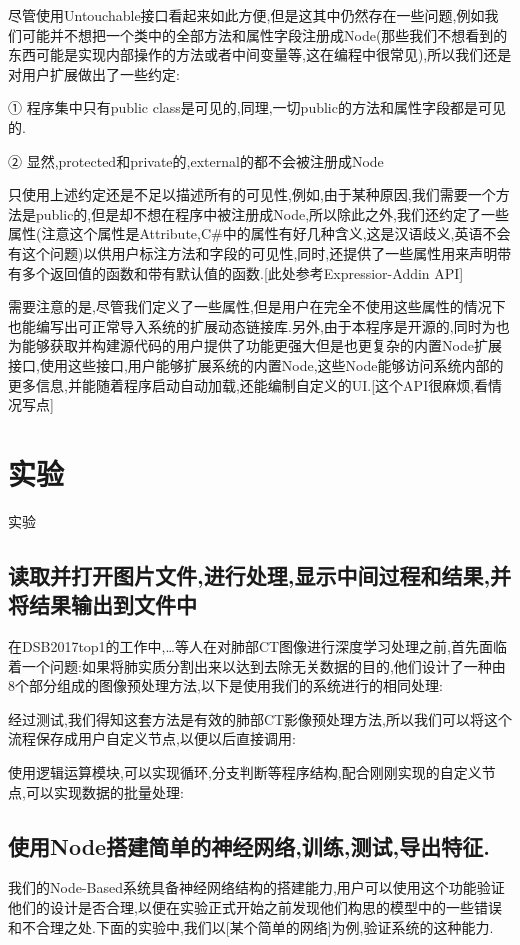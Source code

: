 \documentclass[10pt,journal,compsoc,UTF8]{IEEEtran}
\begin{document}
尽管使用Untouchable接口看起来如此方便,但是这其中仍然存在一些问题,例如我们可能并不想把一个类中的全部方法和属性字段注册成Node(那些我们不想看到的东西可能是实现内部操作的方法或者中间变量等,这在编程中很常见),所以我们还是对用户扩展做出了一些约定:

① 程序集中只有public class是可见的,同理,一切public的方法和属性字段都是可见的.

② 显然,protected和private的,external的都不会被注册成Node

只使用上述约定还是不足以描述所有的可见性,例如,由于某种原因,我们需要一个方法是public的,但是却不想在程序中被注册成Node,所以除此之外,我们还约定了一些属性(注意这个属性是Attribute,C\#中的属性有好几种含义,这是汉语歧义,英语不会有这个问题)以供用户标注方法和字段的可见性,同时,还提供了一些属性用来声明带有多个返回值的函数和带有默认值的函数.[此处参考Expressior-Addin API]

需要注意的是,尽管我们定义了一些属性,但是用户在完全不使用这些属性的情况下也能编写出可正常导入系统的扩展动态链接库.另外,由于本程序是开源的,同时为也为能够获取并构建源代码的用户提供了功能更强大但是也更复杂的内置Node扩展接口,使用这些接口,用户能够扩展系统的内置Node,这些Node能够访问系统内部的更多信息,并能随着程序启动自动加载,还能编制自定义的UI.[这个API很麻烦,看情况写点]

\section{实验}
实验
  \subsection{读取并打开图片文件,进行处理,显示中间过程和结果,并将结果输出到文件中}
  在DSB2017top1的工作中,…等人在对肺部CT图像进行深度学习处理之前,首先面临着一个问题:如果将肺实质分割出来以达到去除无关数据的目的,他们设计了一种由8个部分组成的图像预处理方法,以下是使用我们的系统进行的相同处理:

  经过测试,我们得知这套方法是有效的肺部CT影像预处理方法,所以我们可以将这个流程保存成用户自定义节点,以便以后直接调用:

	使用逻辑运算模块,可以实现循环,分支判断等程序结构,配合刚刚实现的自定义节点,可以实现数据的批量处理:
  \subsection{使用Node搭建简单的神经网络,训练,测试,导出特征.}
  我们的Node-Based系统具备神经网络结构的搭建能力,用户可以使用这个功能验证他们的设计是否合理,以便在实验正式开始之前发现他们构思的模型中的一些错误和不合理之处.下面的实验中,我们以[某个简单的网络]为例,验证系统的这种能力.
\end{document}
